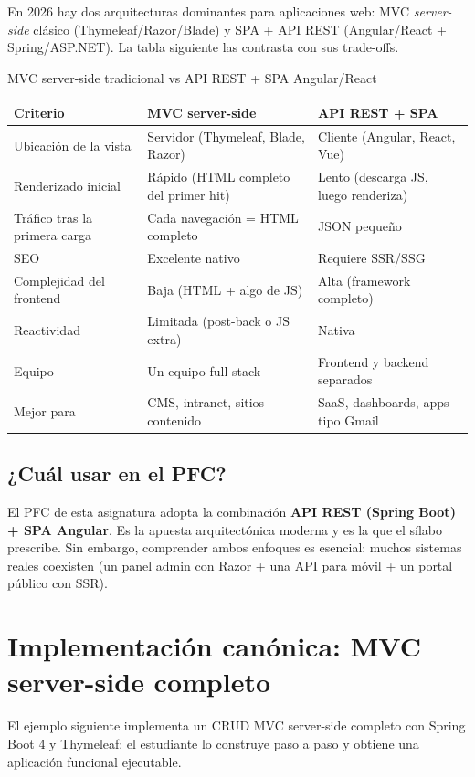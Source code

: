 En 2026 hay dos arquitecturas dominantes para aplicaciones
web: MVC \emph{server-side} clásico (Thymeleaf/Razor/Blade) y SPA +
API REST (Angular/React + Spring/ASP.NET). La tabla siguiente las
contrasta con sus trade-offs.


\begin{cajacompara}{MVC server-side tradicional vs API REST + SPA Angular/React}
\centering\footnotesize
\begin{tabularx}{\textwidth}{lXX}
\toprule
\textbf{Criterio} & \textbf{MVC server-side} & \textbf{API REST + SPA}\\
\midrule
Ubicación de la vista & Servidor (Thymeleaf, Blade, Razor) & Cliente (Angular, React, Vue)\\
Renderizado inicial & Rápido (HTML completo del primer hit) & Lento (descarga JS, luego renderiza)\\
Tráfico tras la primera carga & Cada navegación = HTML completo & JSON pequeño\\
SEO & Excelente nativo & Requiere SSR/SSG\\
Complejidad del frontend & Baja (HTML + algo de JS) & Alta (framework completo)\\
Reactividad & Limitada (post-back o JS extra) & Nativa\\
Equipo & Un equipo full-stack & Frontend y backend separados\\
Mejor para & CMS, intranet, sitios contenido & SaaS, dashboards, apps tipo Gmail\\
\bottomrule
\end{tabularx}
\end{cajacompara}

\subsection{¿Cuál usar en el PFC?}

El PFC de esta asignatura adopta la combinación \textbf{API REST
(Spring Boot) + SPA Angular}. Es la apuesta arquitectónica moderna y
es la que el sílabo prescribe. Sin embargo, comprender ambos
enfoques es esencial: muchos sistemas reales coexisten (un panel
admin con Razor + una API para móvil + un portal público con SSR).

\section{Implementación canónica: MVC server-side completo}

El ejemplo siguiente implementa un CRUD MVC server-side
completo con Spring Boot 4 y Thymeleaf: el estudiante lo construye
paso a paso y obtiene una aplicación funcional ejecutable.


